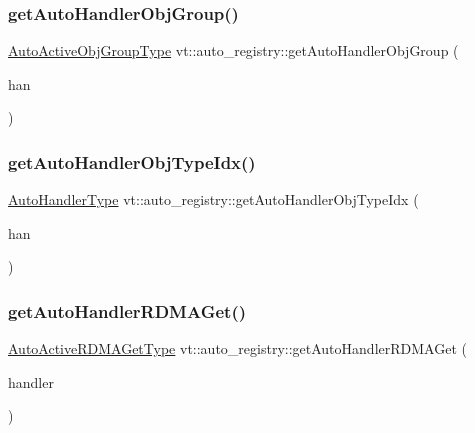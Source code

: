 \subsubsection{\texorpdfstring{get\+Auto\+Handler\+Obj\+Group()}{getAutoHandlerObjGroup()}}
{\footnotesize\ttfamily \hyperlink{namespacevt_1_1auto__registry_a861d9d01e89c81f0a955188724aa25b3}{Auto\+Active\+Obj\+Group\+Type} vt\+::auto\+\_\+registry\+::get\+Auto\+Handler\+Obj\+Group (\begin{DoxyParamCaption}\item[{\hyperlink{namespacevt_af64846b57dfcaf104da3ef6967917573}{Handler\+Type}}]{han }\end{DoxyParamCaption})\hspace{0.3cm}{\ttfamily [inline]}}

\mbox{\label{namespacevt_1_1auto__registry_a0c47caf1e4978208704029c0d0f925f0}} 
\subsubsection{\texorpdfstring{get\+Auto\+Handler\+Obj\+Type\+Idx()}{getAutoHandlerObjTypeIdx()}}
{\footnotesize\ttfamily \hyperlink{namespacevt_1_1auto__registry_ae295e18699146815bb7d7674594d95d7}{Auto\+Handler\+Type} vt\+::auto\+\_\+registry\+::get\+Auto\+Handler\+Obj\+Type\+Idx (\begin{DoxyParamCaption}\item[{\hyperlink{namespacevt_af64846b57dfcaf104da3ef6967917573}{Handler\+Type}}]{han }\end{DoxyParamCaption})\hspace{0.3cm}{\ttfamily [inline]}}

\mbox{\label{namespacevt_1_1auto__registry_a28f13a453b20fa9ccdfafaaab238bb65}} 
\subsubsection{\texorpdfstring{get\+Auto\+Handler\+R\+D\+M\+A\+Get()}{getAutoHandlerRDMAGet()}}
{\footnotesize\ttfamily \hyperlink{namespacevt_1_1auto__registry_a039813f93a5804c77ae612e0318fb335}{Auto\+Active\+R\+D\+M\+A\+Get\+Type} vt\+::auto\+\_\+registry\+::get\+Auto\+Handler\+R\+D\+M\+A\+Get (\begin{DoxyParamCaption}\item[{\hyperlink{namespacevt_af64846b57dfcaf104da3ef6967917573}{Handler\+Type} const}]{handler }\end{DoxyParamCaption})\hspace{0.3cm}{\ttfamily [inline]}}

